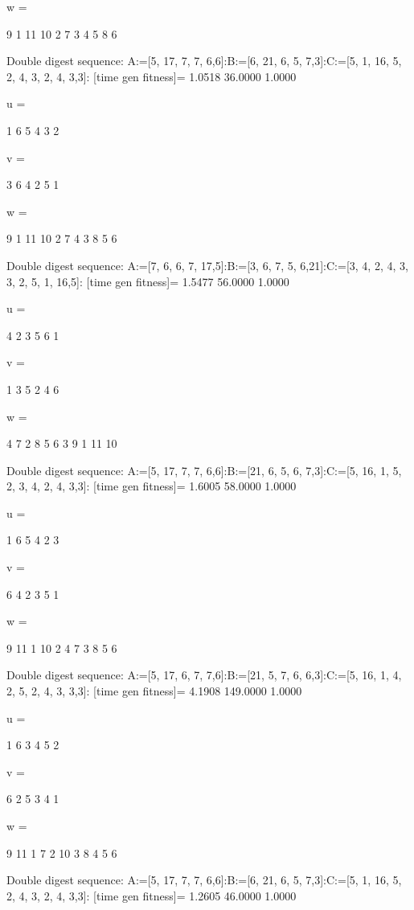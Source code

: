 w =

     9     1    11    10     2     7     3     4     5     8     6

Double digest sequence:
A:=[5, 17, 7, 7, 6,6]:B:=[6, 21, 6, 5, 7,3]:C:=[5, 1, 16, 5, 2, 4, 3, 2, 4, 3,3]:
[time gen fitness]=
    1.0518   36.0000    1.0000


u =

     1     6     5     4     3     2


v =

     3     6     4     2     5     1


w =

     9     1    11    10     2     7     4     3     8     5     6

Double digest sequence:
A:=[7, 6, 6, 7, 17,5]:B:=[3, 6, 7, 5, 6,21]:C:=[3, 4, 2, 4, 3, 3, 2, 5, 1, 16,5]:
[time gen fitness]=
    1.5477   56.0000    1.0000


u =

     4     2     3     5     6     1


v =

     1     3     5     2     4     6


w =

     4     7     2     8     5     6     3     9     1    11    10

Double digest sequence:
A:=[5, 17, 7, 7, 6,6]:B:=[21, 6, 5, 6, 7,3]:C:=[5, 16, 1, 5, 2, 3, 4, 2, 4, 3,3]:
[time gen fitness]=
    1.6005   58.0000    1.0000


u =

     1     6     5     4     2     3


v =

     6     4     2     3     5     1


w =

     9    11     1    10     2     4     7     3     8     5     6

Double digest sequence:
A:=[5, 17, 6, 7, 7,6]:B:=[21, 5, 7, 6, 6,3]:C:=[5, 16, 1, 4, 2, 5, 2, 4, 3, 3,3]:
[time gen fitness]=
    4.1908  149.0000    1.0000


u =

     1     6     3     4     5     2


v =

     6     2     5     3     4     1


w =

     9    11     1     7     2    10     3     8     4     5     6

Double digest sequence:
A:=[5, 17, 7, 7, 6,6]:B:=[6, 21, 6, 5, 7,3]:C:=[5, 1, 16, 5, 2, 4, 3, 2, 4, 3,3]:
[time gen fitness]=
    1.2605   46.0000    1.0000


